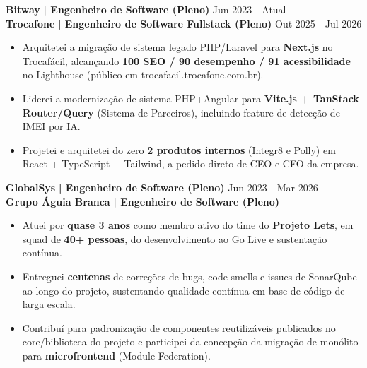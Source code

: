 \documentclass[a4paper]{article}
\begin{document}
    \textbf{Bitway}\textbf{ | Engenheiro de Software (Pleno)} \hfill  Jun 2023 - Atual\\
    \textbf{Trocafone}\textbf{ | Engenheiro de Software Fullstack (Pleno)}  \hfill  Out 2025 - Jul 2026\\
    \vspace{-3mm}
    \begin{itemize} \itemsep -3pt
        \item Arquitetei a migra\c{c}\~ao de sistema legado PHP/Laravel para \textbf{Next.js} no Trocaf\'acil, alcan\c{c}ando \textbf{100 SEO / 90 desempenho / 91 acessibilidade} no Lighthouse (p\'ublico em trocafacil.trocafone.com.br).
    \end{itemize}
    \vspace{-3mm}
    \begin{itemize} \itemsep -3pt
        \item Liderei a moderniza\c{c}\~ao de sistema PHP+Angular para \textbf{Vite.js + TanStack Router/Query} (Sistema de Parceiros), incluindo feature de detec\c{c}\~ao de IMEI por IA.
        \item Projetei e arquitetei do zero \textbf{2 produtos internos} (Integr8 e Polly) em React + TypeScript + Tailwind, a pedido direto de CEO e CFO da empresa.
    \end{itemize}

    \textbf{GlobalSys}\textbf{ | Engenheiro de Software (Pleno)} \hfill  Jun 2023 - Mar 2026\\
    \textbf{Grupo \'Aguia Branca}\textbf{ | Engenheiro de Software (Pleno)}\\
    \vspace{-3mm}
    \begin{itemize} \itemsep -3pt
        \item Atuei por \textbf{quase 3 anos} como membro ativo do time do \textbf{Projeto Lets}, em squad de \textbf{40+ pessoas}, do desenvolvimento ao Go Live e sustenta\c{c}\~ao cont\'inua.
        \item Entreguei \textbf{centenas} de corre\c{c}\~oes de bugs, code smells e issues de SonarQube ao longo do projeto, sustentando qualidade cont\'inua em base de c\'odigo de larga escala.
        \item Contribu\'i para padroniza\c{c}\~ao de componentes reutiliz\'aveis publicados no core/biblioteca do projeto e participei da concep\c{c}\~ao da migra\c{c}\~ao de mon\'olito para \textbf{microfrontend} (Module Federation).
    \end{itemize}
\end{document}
